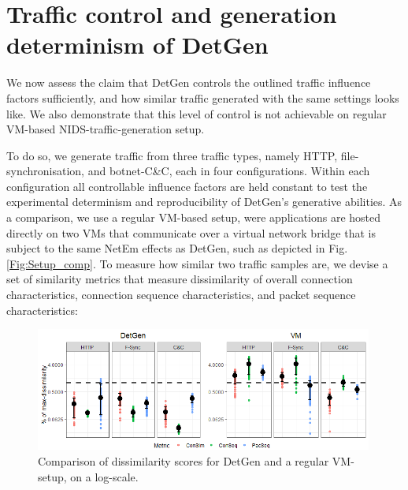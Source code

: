 \documentclass[runningheads]{llncs}
\begin{document}




\section{Traffic control and generation determinism of DetGen}\label{Sec:Determinism}
We now assess the claim that DetGen controls the outlined traffic influence factors sufficiently, and how similar traffic generated with the same settings looks like. We also demonstrate that this level of control is not achievable on regular VM-based NIDS-traffic-generation setup.

To do so, we generate traffic from three traffic types, namely HTTP, file-synchronisation, and botnet-C\&C, each in four configurations. Within each configuration all controllable influence factors are held constant to test the experimental determinism and reproducibility of DetGen's generative abilities. 
As a comparison, we use a regular VM-based setup, were applications are hosted directly on two VMs that communicate over a virtual network bridge that is subject to the same NetEm effects as DetGen, such as depicted in Fig. \ref{Fig:Setup_comp}. To measure how similar two traffic samples are, we devise a set of similarity metrics that measure dissimilarity of overall connection characteristics, connection sequence characteristics, and packet sequence characteristics:


\begin{figure}
\centering
\includegraphics[width=0.99\textwidth]{images/Exp111.png}
\caption{Comparison of dissimilarity scores for DetGen and a regular VM-setup, on a log-scale.}\label{Fig:determ-metric}
\end{figure}
\end{document}
